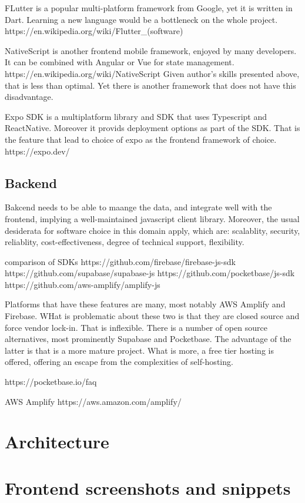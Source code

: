 \documentclass{report}
\begin{document}
FLutter is a popular multi-platform framework from Google, yet it is written in Dart. Learning a new language would be a bottleneck on the whole project.
https://en.wikipedia.org/wiki/Flutter_(software)

NativeScript is another frontend mobile framework, enjoyed by many developers. It can be combined with Angular or Vue for state management.
https://en.wikipedia.org/wiki/NativeScript
Given author's skills presented above, that is less than optimal. Yet there is another framework that does not have this disadvantage.

Expo SDK is a multiplatform library and SDK that uses Typescript and ReactNative.
Moreover it provids deployment options as part of the SDK. That is the feature that lead to choice of expo as the frontend framework of choice. 
https://expo.dev/

\subsection{Backend}

Bakcend needs to be able to maange the data, and integrate well with the frontend, implying a well-maintained javascript client library.
Moreover, the usual desiderata for software choice in this domain apply, which are: scalablity, security, reliablity, cost-effectiveness, degree of technical support, flexibility. 

comparison of SDKs
https://github.com/firebase/firebase-js-sdk
https://github.com/supabase/supabase-js
https://github.com/pocketbase/js-sdk
https://github.com/aws-amplify/amplify-js

Platforms that have these features are many, most notably AWS Amplify and Firebase. WHat is problematic about these two is that they are closed source and force vendor lock-in. 
That is inflexible. There is a number of open source alternatives, most prominently Supabase and Pocketbase. The advantage of the latter is that is a more mature project. What is more, a free tier hosting is offered, offering an escape from the complexities of self-hosting. 

https://pocketbase.io/faq

AWS Amplify
https://aws.amazon.com/amplify/


\section{Architecture}

\section{Frontend screenshots and snippets}
\end{document}
